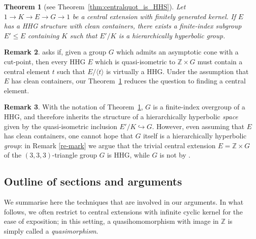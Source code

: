 \documentclass[svgnames]{amsart}
\theoremstyle{plain}
\newtheorem{thm}{Theorem}[section]
\theoremstyle{definition}
\newtheorem{rem}[thm]{Remark}
\newcommand{\Z}{\mathbb{Z}}
\begin{document}
\begin{thm}[see Theorem~\ref{thm:centralquot_is_HHS}]\label{thm:centralquot_is_HHS:intro}
    Let $1\to K\to E\to G\to 1$ be a central extension with finitely generated kernel. If $E$ has a HHG structure with clean containers, there exists a finite-index subgroup $E'\le E$ containing $K$ such that $E'/K$ is a hierarchically hyperbolic group.
\end{thm}



\begin{rem}
    \cite[Question 6.8]{uniform_undistortion} asks if, given a group $G$ which admits an asymptotic cone with a cut-point, then every HHG $E$ which is quasi-isometric to $\Z\times G$ must contain a central element $t$ such that $E/\langle t\rangle$ is virtually a HHG. Under the assumption that $E$ has clean containers, our Theorem~\ref{thm:centralquot_is_HHS:intro} reduces the question to finding a central element.
\end{rem}

\begin{rem}
    With the notation of Theorem~\ref{thm:centralquot_is_HHS:intro}, $G$ is a finite-index overgroup of a HHG, and therefore inherits the structure of a hierarchically hyperbolic \emph{space} given by the quasi-isometric inclusion $E'/K\hookrightarrow G$. However, even assuming that $E$ has clean containers, one cannot hope that $G$ itself is a hierarchically hyperbolic \emph{group}: in Remark \ref{re-mark} we argue that the trivial central extension $E=\Z\times G$ of the $(3,3,3)$-triangle group $G$ is HHG, while $G$ is not by \cite{PS_unbounded}.
\end{rem}






\subsection*{Outline of sections and arguments}
We summarise here the techniques that are involved in our arguments. In what follows, we often restrict to central extensions with infinite cyclic kernel for the ease of exposition; in this setting, a quasihomomorphism with image in $\Z$ is simply called a \emph{quasimorphism}.
\end{document}
